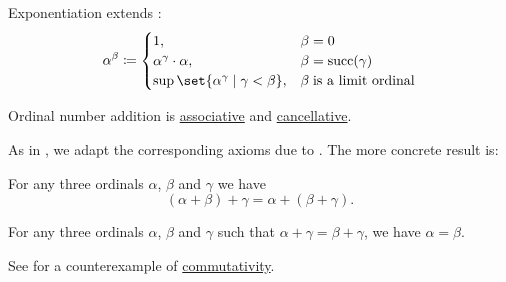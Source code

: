 \begin{definition}
\begin{thmenum}
     Exponentiation extends :
    \begin{equation}\label{eq:def:ordinal_arithmetic/exponentiation}
      \alpha^\beta \coloneqq \begin{cases}
        1,                                               &\beta = 0 \\
        \alpha^\gamma \cdot \alpha,                      &\beta = \op{succ}(\gamma)\\
        \sup\set{ \alpha^\gamma \given \gamma < \beta }, &\beta \T{is a limit ordinal}\\
      \end{cases}
    \end{equation}
  \end{thmenum}
\end{definition}

\begin{proposition}\label{thm:ordinal_addition_properties}
  Ordinal number addition is \hyperref[def:magma/associative]{associative} and \hyperref[def:magma/cancellative]{cancellative}.

  As in , we adapt the corresponding axioms due to . The more concrete result is:
  \begin{thmenum}
     For any three ordinals \( \alpha \), \( \beta \) and \( \gamma \) we have
    \begin{equation}\label{eq:thm:ordinal_addition_properties/associative}
      (\alpha + \beta) + \gamma = \alpha + (\beta + \gamma).
    \end{equation}

     For any three ordinals \( \alpha \), \( \beta \) and \( \gamma \) such that \( \alpha + \gamma = \beta + \gamma \), we have \( \alpha = \beta \).
  \end{thmenum}

   See  for a counterexample of \hyperref[def:magma/commutativity]{commutativity}.
\end{proposition}

